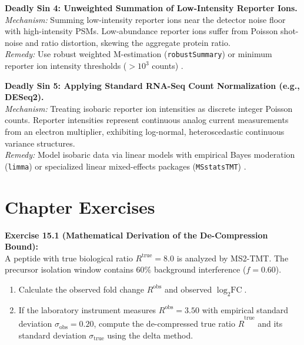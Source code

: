 \documentclass[11pt,oneside]{book}
\begin{document}
\begin{pitfallbox}
\textbf{Deadly Sin 4: Unweighted Summation of Low-Intensity Reporter Ions.}\\
\textit{Mechanism:} Summing low-intensity reporter ions near the detector noise floor with high-intensity PSMs. Low-abundance reporter ions suffer from Poisson shot-noise and ratio distortion, skewing the aggregate protein ratio.\\
\textit{Remedy:} Use robust weighted M-estimation (\texttt{robustSummary}) or minimum reporter ion intensity thresholds ($>10^3$ counts) \cite{gatto2023qfeatures}.
\end{pitfallbox}

\begin{pitfallbox}
\textbf{Deadly Sin 5: Applying Standard RNA-Seq Count Normalization (e.g., DESeq2).}\\
\textit{Mechanism:} Treating isobaric reporter ion intensities as discrete integer Poisson counts. Reporter intensities represent continuous analog current measurements from an electron multiplier, exhibiting log-normal, heteroscedastic continuous variance structures.\\
\textit{Remedy:} Model isobaric data via linear models with empirical Bayes moderation (\texttt{limma}) or specialized linear mixed-effects packages (\texttt{MSstatsTMT}) \cite{huang2020msstatstmt}.
\end{pitfallbox}

\section{Chapter Exercises}

\noindent\textbf{Exercise 15.1 (Mathematical Derivation of the De-Compression Bound):}\\
A peptide with true biological ratio $R^{\text{true}} = 8.0$ is analyzed by MS2-TMT. The precursor isolation window contains $60\%$ background interference ($f = 0.60$).
\begin{enumerate}
    \item Calculate the observed fold change $R^{\text{obs}}$ and observed $\log_2\text{FC}$.
    \item If the laboratory instrument measures $R^{\text{obs}} = 3.50$ with empirical standard deviation $\sigma_{\text{obs}} = 0.20$, compute the de-compressed true ratio $\hat{R}^{\text{true}}$ and its standard deviation $\sigma_{\text{true}}$ using the delta method.
\end{enumerate}
\end{document}
